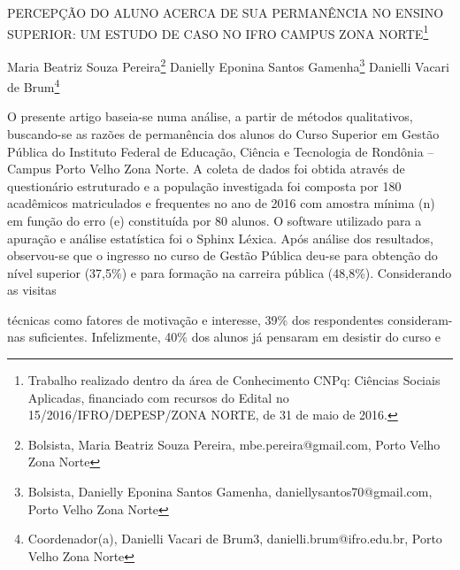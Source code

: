 \documentclass[article,12pt,onesidea,4paper,english,brazil]{abntex2}
\begin{document}
	
	
	\frenchspacing 
	
	\begin{center}
		\LARGE PERCEPÇÃO DO ALUNO ACERCA DE SUA PERMANÊNCIA NO ENSINO
		SUPERIOR: UM ESTUDO DE CASO NO IFRO CAMPUS ZONA NORTE\footnote{Trabalho realizado dentro da área de Conhecimento CNPq: Ciências Sociais Aplicadas, financiado
			com recursos do Edital no 15/2016/IFRO/DEPESP/ZONA NORTE, de 31 de maio de 2016.}
		
		\normalsize
		Maria Beatriz Souza Pereira\footnote{Bolsista, Maria Beatriz Souza Pereira, mbe.pereira@gmail.com, Porto Velho Zona Norte} 
		Danielly Eponina Santos Gamenha\footnote{Bolsista, Danielly Eponina Santos Gamenha, daniellysantos70@gmail.com, Porto Velho Zona Norte} 
		Danielli Vacari de Brum\footnote{Coordenador(a), Danielli Vacari de Brum3, danielli.brum@ifro.edu.br, Porto Velho Zona Norte} 
		
	\end{center}
	
	\noindent O presente artigo baseia-se numa análise, a partir de métodos qualitativos,
	buscando-se as razões de permanência dos alunos do Curso Superior em Gestão
	Pública do Instituto Federal de Educação, Ciência e Tecnologia de Rondônia –
	Campus Porto Velho Zona Norte. A coleta de dados foi obtida através de
	questionário estruturado e a população investigada foi composta por 180
	acadêmicos matriculados e frequentes no ano de 2016 com amostra mínima (n) em
	função do erro (e) constituída por 80 alunos. O software utilizado para a apuração e
	análise estatística foi o Sphinx Léxica. Após análise dos resultados, observou-se que
	o ingresso no curso de Gestão Pública deu-se para obtenção do nível superior
	(37,5\%) e para formação na carreira pública (48,8\%). Considerando as visitas
	
	técnicas como fatores de motivação e interesse, 39\% dos respondentes consideram-
	nas suficientes. Infelizmente, 40\% dos alunos já pensaram em desistir do curso e
	
\end{document}
